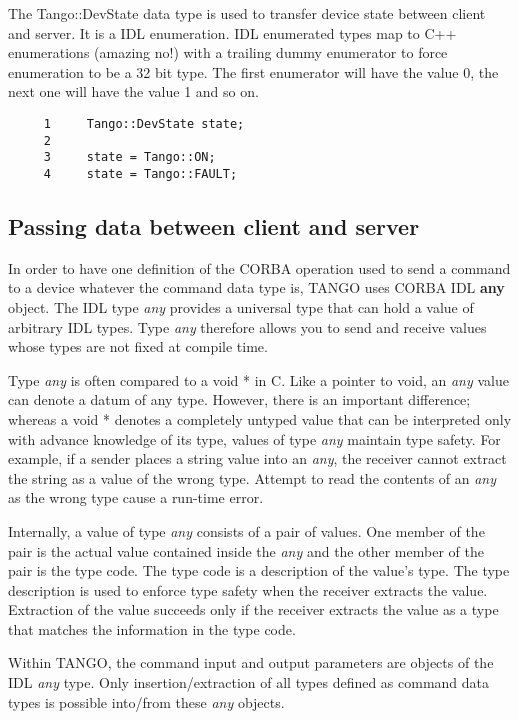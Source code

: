 The Tango::DevState data type is used to transfer
device state between client and server. It is a IDL enumeration. IDL
enumerated types map to C++ enumerations (amazing no!) with a trailing
dummy enumerator to force enumeration to be a 32 bit type. The first
enumerator will have the value 0, the next one will have the value
1 and so on.


\begin{verbatim}
     1     Tango::DevState state;
     2  
     3     state = Tango::ON;
     4     state = Tango::FAULT;
\end{verbatim}



\subsection{Passing data between client and server}

In order to have one definition of the CORBA operation used to send
a command to a device whatever the command data type is, TANGO uses
CORBA IDL \textbf{any} object. The IDL type \emph{any}
provides a universal type that can hold a value of arbitrary IDL types.
Type \emph{any} therefore allows you to send and receive values whose
types are not fixed at compile time.

Type \emph{any} is often compared to a void {*} in C. Like a pointer
to void, an \emph{any} value can denote a datum of any type. However,
there is an important difference; whereas a void {*} denotes a completely
untyped value that can be interpreted only with advance knowledge
of its type, values of type \emph{any} maintain type safety. For example,
if a sender places a string value into an \emph{any}, the receiver
cannot extract the string as a value of the wrong type. Attempt to
read the contents of an \emph{any} as the wrong type cause a run-time
error.

Internally, a value of type \emph{any} consists of a pair of values.
One member of the pair is the actual value contained inside the \emph{any}
and the other member of the pair is the type code. The type code is
a description of the value's type. The type description is used to
enforce type safety when the receiver extracts the value. Extraction
of the value succeeds only if the receiver extracts the value as a
type that matches the information in the type code.

Within TANGO, the command input and output parameters are objects
of the IDL \emph{any} type. Only insertion/extraction of all types
defined as command data types is possible into/from these \emph{any}
objects.


